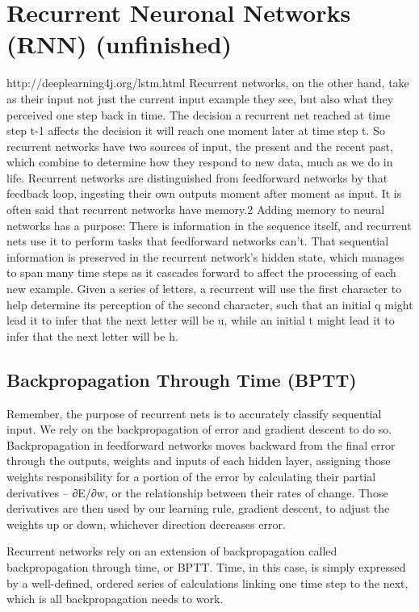 {\section{Recurrent Neuronal Networks (RNN) (unfinished)}
http://deeplearning4j.org/lstm.html
Recurrent networks, on the other hand, take as their input not just the current input example they see, but also what they perceived one step back in time.
The decision a recurrent net reached at time step t-1 affects the decision it will reach one moment later at time step t. So recurrent networks have two sources of input, the present and the recent past, which combine to determine how they respond to new data, much as we do in life.
Recurrent networks are distinguished from feedforward networks by that feedback loop, ingesting their own outputs moment after moment as input. It is often said that recurrent networks have memory.2 Adding memory to neural networks has a purpose: There is information in the sequence itself, and recurrent nets use it to perform tasks that feedforward networks can’t.
That sequential information is preserved in the recurrent network’s hidden state, which manages to span many time steps as it cascades forward to affect the processing of each new example.
Given a series of letters, a recurrent will use the first character to help determine its perception of the second character, such that an initial q might lead it to infer that the next letter will be u, while an initial t might lead it to infer that the next letter will be h.

\subsection{Backpropagation Through Time (BPTT)}
Remember, the purpose of recurrent nets is to accurately classify sequential input. We rely on the backpropagation of error and gradient descent to do so.
Backpropagation in feedforward networks moves backward from the final error through the outputs, weights and inputs of each hidden layer, assigning those weights responsibility for a portion of the error by calculating their partial derivatives – ∂E/∂w, or the relationship between their rates of change. Those derivatives are then used by our learning rule, gradient descent, to adjust the weights up or down, whichever direction decreases error.

Recurrent networks rely on an extension of backpropagation called backpropagation through time, or BPTT. Time, in this case, is simply expressed by a well-defined, ordered series of calculations linking one time step to the next, which is all backpropagation needs to work.

}
